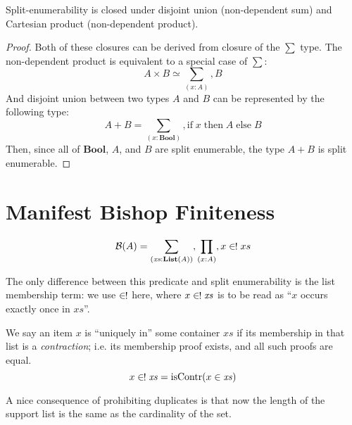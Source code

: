\begin{rm-lemma}
  Split-enumerability is closed under disjoint union (non-dependent sum) and
  Cartesian product (non-dependent product).
\end{rm-lemma}
\begin{proof}
  Both of these closures can be derived from closure of the \(\sum\) type.
  The non-dependent product is equivalent to a special case of \(\sum\):
  \begin{equation}
    A \times B \simeq \sum_{(x : A)} , B
  \end{equation}
  And disjoint union between two types \(A\) and \(B\) can be represented by the
  following type:
  \begin{equation}
    A + B = \sum_{(x : \mathbf{Bool})} , \text{if} \; x \; \text{then} \; A \; \text{else} \; B
  \end{equation}
  Then, since all of \(\mathbf{Bool}\), \(A\), and \(B\) are split enumerable,
  the type \(A + B\) is split enumerable.
\end{proof}
\section{Manifest Bishop Finiteness} \label{manifest-bishop}
\begin{rm-definition}
  \begin{equation}
    \mathcal{B}(A) = \sum_{(\mathit{xs} : \textbf{List}(A))} , \prod_{(x : A)} , x \inunique xs
  \end{equation}
\end{rm-definition}
The only difference between this predicate and split enumerability is the list
membership term: we use \(\inunique\) here, where \(x \inunique \mathit{xs}\) is
to be read as ``\(x\) occurs exactly once in \(\mathit{xs}\)''.
\begin{rm-definition}
  We say an item \(x\) is ``uniquely in'' some container \(\mathit{xs}\) if its
  membership in that list is a \emph{contraction}; i.e. its membership proof
  exists, and all such proofs are equal.
  \begin{equation}
    x \inunique \mathit{xs} = \text{isContr}(x \in \mathit{xs})
  \end{equation}
\end{rm-definition}

A nice consequence of prohibiting duplicates is that now the length of the
support list is the same as the cardinality of the set.
